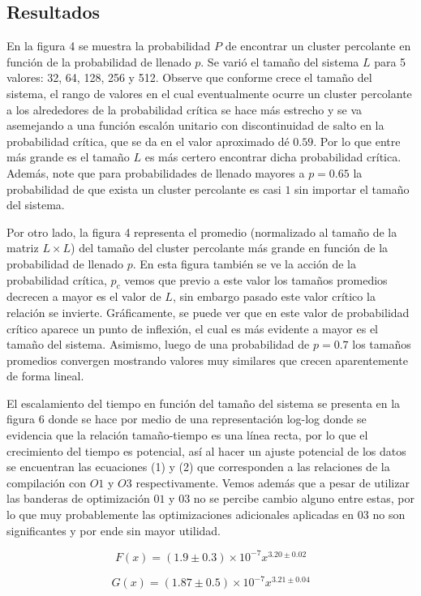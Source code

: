\documentclass{article}
\begin{document}
\begin{multicols}{2}

\section{Resultados} 


En la figura 4 se muestra la probabilidad $P$  de encontrar un cluster percolante en función de la probabilidad de llenado $p$. Se varió el tamaño del sistema $L$ para 5 valores: 32, 64, 128, 256 y 512. Observe que conforme crece el tamaño del sistema, el rango de valores en el cual eventualmente ocurre un cluster percolante a los alrededores de la probabilidad crítica se hace más estrecho y se va asemejando a una función escalón unitario con discontinuidad de salto en la probabilidad crítica, que se da en el valor aproximado dé $0.59$. Por lo que entre más grande es el tamaño $L$ es más certero encontrar dicha probabilidad crítica. Además, note que para probabilidades de llenado mayores a $p=0.65$ la probabilidad de que exista un cluster percolante es casi $1$ sin importar el tamaño del sistema.

Por otro lado, la figura 4 representa el promedio (normalizado al tamaño de la matriz $L \times L$) del tamaño del cluster percolante más grande en función de la probabilidad de llenado $p$. En esta figura también se ve la acción de la probabilidad crítica, $p_c$ vemos que previo a este valor  los tamaños promedios decrecen a mayor es el valor de $L$, sin embargo pasado este valor crítico la relación se invierte. Gráficamente, se puede ver que en este valor de probabilidad crítico aparece un punto de inflexión, el cual es más evidente a mayor es el tamaño del sistema. Asimismo, luego de una probabilidad de $p=0.7$ los tamaños promedios convergen mostrando valores muy similares que crecen aparentemente de forma lineal. 

El escalamiento del tiempo en función del tamaño del sistema se presenta en la figura 6 donde se hace por medio de una representación log-log donde se evidencia que la relación tamaño-tiempo es una línea recta, por lo que el crecimiento del tiempo es potencial, así al hacer un ajuste potencial de los datos se encuentran las ecuaciones (1) y (2) que corresponden a las relaciones de la compilación con $O1$ y $O3$ respectivamente. Vemos además que a pesar de utilizar las banderas de optimización $01$ y $03$ no se percibe cambio alguno entre estas, por lo que muy probablemente las optimizaciones adicionales aplicadas en $03$ no son significantes y por ende sin mayor utilidad.


\begin{equation}
        F(x) = (1.9 \pm 0.3)\times10^{-7}x^{3.20\pm0.02}
\end{equation}

\begin{equation}
        G(x) =(1.87 \pm 0.5)\times10^{-7}x^{3.21\pm0.04}
\end{equation}


\end{multicols}{}
\end{document}
